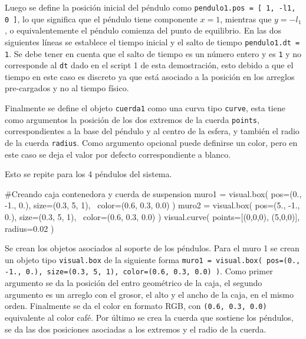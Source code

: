 Luego se define la posición inicial del péndulo como
\texttt{pendulo1.pos = [ 1, -l1, 0 ]}, lo que significa que el péndulo 
tiene componente $x=1$, mientras que $y = -l_1$, o equivalentemente el 
péndulo comienza del punto de equilibrio. En las dos siguientes líneas
se establece el tiempo inicial y el salto de tiempo 
\texttt{pendulo1.dt = 1}. Se debe tener en cuenta que el salto de tiempo
es un número entero y es \texttt{1} y no corresponde al \texttt{dt} dado 
en el script 1 de esta demostración, esto debido a que el tiempo en este 
caso es discreto ya que está asociado a la posición en los arreglos pre-cargados 
y no al tiempo físico. 


Finalmente se define el objeto \texttt{cuerda1} como una curva tipo 
\texttt{curve}, esta tiene como argumentos la posición de los dos extremos 
de la cuerda \texttt{points}, correspondientes a la base del péndulo y al 
centro de la esfera, y también el radio de la cuerda \texttt{radius}. Como
argumento opcional puede definirse un color, pero en este caso se deja el 
valor por defecto correspondiente a blanco.


Esto se repite para los 4 péndulos del sistema.


\begin{listing}[style=python, numbers = none]
#Creando caja contenedora y cuerda de suspension
muro1 = visual.box( pos=(0., -1., 0.), size=(0.3, 5, 1), \
color=(0.6, 0.3, 0.0) )
muro2 = visual.box( pos=(5., -1., 0.), size=(0.3, 5, 1), \
color=(0.6, 0.3, 0.0) )
visual.curve( points=[(0,0,0), (5,0,0)], radius=0.02 )
\end{listing}
Se crean los objetos asociados al soporte de los péndulos. Para el muro 1
se crean un objeto tipo \texttt{visual.box} de la siguiente forma 
\texttt{muro1 = visual.box( pos=(0., -1., 0.), size=(0.3, 5, 1), 
color=(0.6, 0.3, 0.0) )}. Como primer argumento se da la posición del entro
geométrico de la caja, el segundo argumento es un arreglo con el grosor, 
el alto y el ancho de la caja, en el mismo orden. Finalmente se da el color
en formato RGB, con \texttt{(0.6, 0.3, 0.0)} equivalente al color café.
Por último se crea la cuerda que sostiene los péndulos, se da las dos 
posiciones asociadas a los extremos y el radio de la cuerda.


